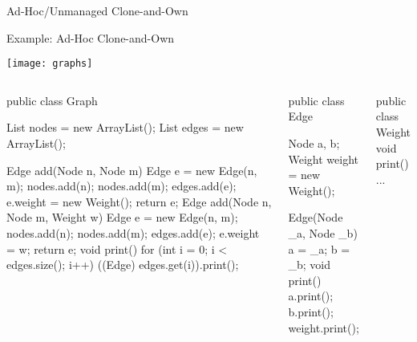 \begin{frame}{Ad-Hoc/Unmanaged Clone-and-Own}
	\begin{mycolumns}[columns=2,widths={50,50},animation=none]
		\vspace{3mm}		
	\mynextcolumn
	\end{mycolumns}	
\end{frame}

\begin{frame}[fragile]{Example: Ad-Hoc Clone-and-Own}
	\vspace{-1.2cm}
	\begin{flushright}
		\texttt{[image: graphs]}		
	\end{flushright}
	\vspace{0.1cm}
	\begin{tiny}
		\begin{columns}
				\vspace{-15mm}
\vspace{3mm}				
\begin{codetight}{}
public class Graph {
	List nodes = new ArrayList();
	List edges = new ArrayList();

	Edge add(Node n, Node m) {
		Edge e = new Edge(n, m);
		nodes.add(n); nodes.add(m); edges.add(e);
		e.weight = new Weight();
		return e;
	}
	Edge add(Node n, Node m, Weight w) {
		Edge e = new Edge(n, m);
		nodes.add(n); nodes.add(m); edges.add(e);
		e.weight = w;
		return e;
	}
	void print() {
		for (int i = 0; i < edges.size(); i++) {
			((Edge) edges.get(i)).print();
		}
	}
}
\end{codetight}
\begin{codetight}{}
public class Edge {
	Node a, b;
	Weight weight = new Weight();

	Edge(Node _a, Node _b) {
		a = _a; b = _b;
	}
	void print() {
		a.print(); b.print();
		weight.print();
	}
}
\end{codetight}
\begin{codetight}{}
public class Weight {
	void print() {...}
}
\end{codetight}
		\end{columns}
	\end{tiny}
\end{frame}

